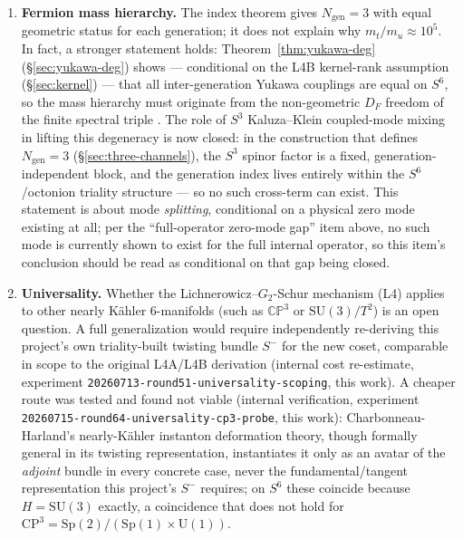 \documentclass[12pt,a4paper]{article}
\begin{document}
\begin{enumerate}
\item \textbf{Fermion mass hierarchy.} The index theorem gives $N_{\mathrm{gen}}=3$ with equal
  geometric status for each generation; it does not explain why $m_t/m_u\approx 10^5$.
  In fact, a stronger statement holds: Theorem~\ref{thm:yukawa-deg} (\S\ref{sec:yukawa-deg})
  shows --- conditional on the L4B kernel-rank assumption (\S\ref{sec:kernel}) --- that all
  inter-generation Yukawa couplings are equal on $S^6$, so the mass
  hierarchy must originate from the non-geometric $D_F$ freedom of the finite spectral
  triple \cite{CCM2006}. The role of $S^3$ Kaluza--Klein coupled-mode mixing in lifting
  this degeneracy is now closed: in the construction that defines $N_{\mathrm{gen}}=3$
  (\S\ref{sec:three-channels}), the $S^3$ spinor factor is a fixed, generation-independent
  block, and the generation index lives entirely within the $S^6$/octonion triality
  structure --- so no such cross-term can exist. This statement is about mode
  \emph{splitting}, conditional on a physical zero mode existing at all; per the
  ``full-operator zero-mode gap'' item above, no such mode is currently shown to
  exist for the full internal operator, so this item's conclusion should be read as
  conditional on that gap being closed.

\item \textbf{Universality.} Whether the Lichnerowicz--$G_2$-Schur mechanism (L4) applies to other
  nearly K\"ahler 6-manifolds (such as $\mathbb{CP}^3$ or $\mathrm{SU}(3)/T^2$) is an open question.
  A full generalization would require independently re-deriving this project's own
  triality-built twisting bundle $S^-$ for the new coset, comparable in scope to the original
  L4A/L4B derivation (internal cost re-estimate, experiment
  \texttt{20260713-round51-universality-scoping}, this work). A cheaper route was tested and
  found not viable (internal verification, experiment
  \texttt{20260715-round64-universality-cp3-probe}, this work): Charbonneau-Harland's
  \cite{CharbonneauHarland2016} nearly-K\"ahler instanton deformation theory, though
  formally general in its twisting representation, instantiates it only as an avatar of the
  \emph{adjoint} bundle in every concrete case, never the fundamental/tangent representation
  this project's $S^-$ requires; on $S^6$ these coincide because $H=\mathrm{SU}(3)$ exactly,
  a coincidence that does not hold for $\mathrm{CP}^3=\mathrm{Sp}(2)/(\mathrm{Sp}(1)\times\mathrm{U}(1))$.


\end{enumerate}
\end{document}
